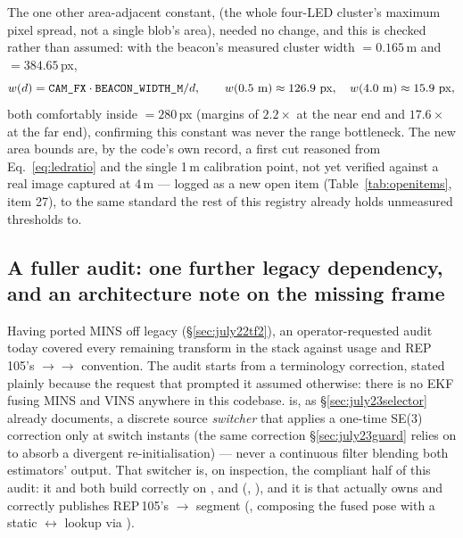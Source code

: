 The one other area-adjacent constant,  (the whole
four-LED cluster's maximum pixel spread, not a single blob's area), needed
no change, and this is checked rather than assumed: with the beacon's
measured cluster width $=0.165$\,m and
$=384.65$\,px,
\begin{equation}
w(d) = \code{CAM\_FX}\cdot\code{BEACON\_WIDTH\_M}/d, \qquad
w(0.5\text{ m}) \approx 126.9\text{ px}, \quad
w(4.0\text{ m}) \approx 15.9\text{ px},
\label{eq:clusterwidth}
\end{equation}
both comfortably inside $=280$\,px (margins of
$2.2\times$ at the near end and $17.6\times$ at the far end), confirming
this constant was never the range bottleneck. The new area bounds are, by
the code's own record, a first cut reasoned from Eq.~\ref{eq:ledratio} and
the single 1\,m calibration point, not yet verified against a real image
captured at 4\,m — logged as a new open item (Table~\ref{tab:openitems},
item 27), to the same standard the rest of this registry already holds
unmeasured thresholds to.

\subsection{A fuller  audit: one further legacy dependency,
and an architecture note on the missing  frame}
\label{sec:july24tf2}
Having ported MINS off legacy  (\S\ref{sec:july22tf2}), an
operator-requested audit today covered every remaining transform in the
stack against  usage and REP\,105's
$\to$$\to$ convention. The audit
starts from a terminology correction, stated plainly because the request
that prompted it assumed otherwise: there is no EKF fusing MINS and VINS
anywhere in this codebase.  is, as
\S\ref{sec:july23selector} already documents, a discrete source
\emph{switcher} that applies a one-time SE(3) correction only at switch
instants (the same correction \S\ref{sec:july23guard} relies on to absorb a
divergent re-initialisation) — never a continuous filter blending both
estimators' output. That switcher is, on inspection, the compliant half of
this audit: it and  both build correctly on
,  and
 (,
), and it is 
that actually owns and correctly publishes REP\,105's
$\to$ segment (,
composing the fused pose with a static $\leftrightarrow$
 lookup via ).

